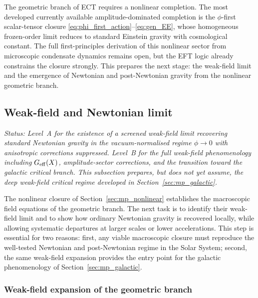 \documentclass[11pt,a4paper]{article}
\numberwithin{equation}{section}
\begin{document}
The geometric branch of ECT requires a nonlinear completion.
The most developed currently available amplitude-dominated completion is
the $\phi$-first scalar-tensor closure
\eqref{eq:phi_first_action}--\eqref{eq:gen_EE},
whose homogeneous frozen-order limit reduces to standard Einstein
gravity with cosmological constant.
The full first-principles derivation of this nonlinear sector from
microscopic condensate dynamics remains open, but the EFT logic already
constrains the closure strongly.
This prepares the next stage: the weak-field limit and the emergence of
Newtonian and post-Newtonian gravity from the nonlinear geometric branch.


\subsection{Weak-field and Newtonian limit}
\label{sec:mp_newtonian}

\textit{Status: Level~A for the existence of a screened weak-field limit
recovering standard Newtonian gravity in the vacuum-normalised regime
$\phi\to 0$ with anisotropic corrections suppressed.
Level~B for the full weak-field phenomenology including $G_{\rm eff}(X)$,
amplitude-sector corrections, and the transition toward the galactic critical
branch.
This subsection prepares, but does not yet assume, the deep weak-field
critical regime developed in Section~\ref{sec:mp_galactic}.}

\medskip
The nonlinear closure of Section~\ref{sec:mp_nonlinear} establishes the
macroscopic field equations of the geometric branch.
The next task is to identify their weak-field limit and to show how
ordinary Newtonian gravity is recovered locally, while allowing
systematic departures at larger scales or lower accelerations.
This step is essential for two reasons: first, any viable macroscopic
closure must reproduce the well-tested Newtonian and post-Newtonian
regime in the Solar System; second, the same weak-field expansion
provides the entry point for the galactic phenomenology of
Section~\ref{sec:mp_galactic}.

\subsubsection*{Weak-field expansion of the geometric branch}
\end{document}
